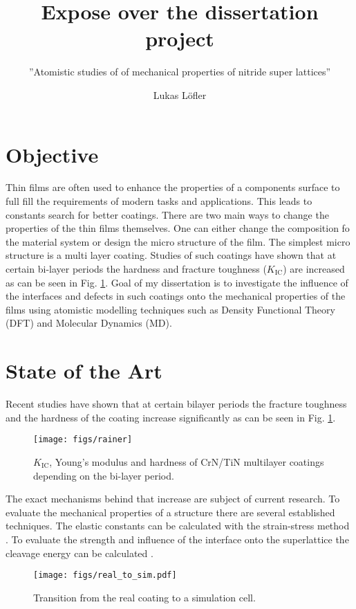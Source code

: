 \documentclass[12pt]{scrartcl}
\begin{document}
\author{Lukas Löfler}
\title{Expose over the dissertation project}
\subtitle{ ''Atomistic studies of of mechanical properties of nitride super lattices''}

\maketitle
\section{Objective}
Thin films are often used to enhance the properties of a components surface to full fill the requirements of modern tasks and applications. This leads to constants search for better coatings. There are two main ways to change the properties of the thin films themselves. One can either change the composition fo the material system or design the micro structure of the film. The simplest micro structure is a multi layer coating. Studies of such coatings have shown that at certain bi-layer periods the hardness and fracture toughness ($K_\mathrm{IC}$) are increased as can be seen in Fig. \ref{Rainer_fig}. Goal of my dissertation is to investigate the influence of the interfaces and defects in such coatings onto the mechanical properties of the films using atomistic modelling techniques such as Density Functional Theory (DFT) and Molecular Dynamics (MD).\medskip


\section{State of the Art}

Recent studies have shown that at certain bilayer periods the fracture toughness and the hardness of the coating increase significantly \cite{Hahn2016} as can be seen in Fig. \ref{Rainer_fig}.   
\begin{figure}[h]
	\centering
	\texttt{[image: figs/rainer]}
	\caption{$K_ \mathrm{IC}$, Young's modulus and hardness of CrN/TiN multilayer coatings depending on the bi-layer period\cite{Hahn2016}.}
	\label{Rainer_fig}
\end{figure}

The exact mechanisms behind that increase are subject of current research. To evaluate the mechanical properties of a structure there are several established techniques. The elastic constants can be calculated with the strain-stress method \cite{Yu2010}. To evaluate the strength and influence of the interface onto the superlattice the cleavage energy can be calculated \cite{Rehak2017}.   
\begin{figure}[h]
	\centering
	\texttt{[image: figs/real\_to\_sim.pdf]}
	\caption{Transition from the real coating to a simulation cell.}
\end{figure}	
\end{document}
